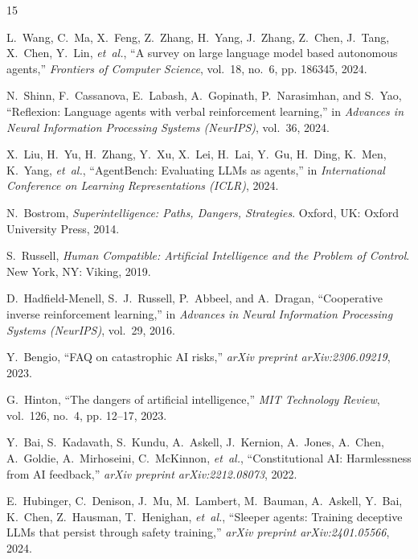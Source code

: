 \documentclass[conference]{IEEEtran}
\begin{document}
\balance

\begin{thebibliography}{15}

L.~Wang, C.~Ma, X.~Feng, Z.~Zhang, H.~Yang, J.~Zhang, Z.~Chen, J.~Tang, X.~Chen, Y.~Lin, \emph{et~al.}, ``A survey on large language model based autonomous agents,'' \emph{Frontiers of Computer Science}, vol.~18, no.~6, pp. 186345, 2024.

N.~Shinn, F.~Cassanova, E.~Labash, A.~Gopinath, P.~Narasimhan, and S.~Yao, ``Reflexion: Language agents with verbal reinforcement learning,'' in \emph{Advances in Neural Information Processing Systems (NeurIPS)}, vol.~36, 2024.

X.~Liu, H.~Yu, H.~Zhang, Y.~Xu, X.~Lei, H.~Lai, Y.~Gu, H.~Ding, K.~Men, K.~Yang, \emph{et~al.}, ``AgentBench: Evaluating LLMs as agents,'' in \emph{International Conference on Learning Representations (ICLR)}, 2024.

N.~Bostrom, \emph{Superintelligence: Paths, Dangers, Strategies}. Oxford, UK: Oxford University Press, 2014.

S.~Russell, \emph{Human Compatible: Artificial Intelligence and the Problem of Control}. New York, NY: Viking, 2019.

D.~Hadfield-Menell, S.~J.~Russell, P.~Abbeel, and A.~Dragan, ``Cooperative inverse reinforcement learning,'' in \emph{Advances in Neural Information Processing Systems (NeurIPS)}, vol.~29, 2016.

Y.~Bengio, ``FAQ on catastrophic AI risks,'' \emph{arXiv preprint arXiv:2306.09219}, 2023.

G.~Hinton, ``The dangers of artificial intelligence,'' \emph{MIT Technology Review}, vol.~126, no.~4, pp. 12--17, 2023.

Y.~Bai, S.~Kadavath, S.~Kundu, A.~Askell, J.~Kernion, A.~Jones, A.~Chen, A.~Goldie, A.~Mirhoseini, C.~McKinnon, \emph{et~al.}, ``Constitutional AI: Harmlessness from AI feedback,'' \emph{arXiv preprint arXiv:2212.08073}, 2022.

E.~Hubinger, C.~Denison, J.~Mu, M.~Lambert, M.~Bauman, A.~Askell, Y.~Bai, K.~Chen, Z.~Hausman, T.~Henighan, \emph{et~al.}, ``Sleeper agents: Training deceptive LLMs that persist through safety training,'' \emph{arXiv preprint arXiv:2401.05566}, 2024.


\end{thebibliography}
\end{document}
